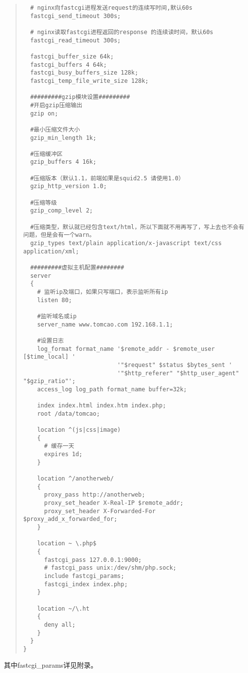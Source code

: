 \documentclass[UTF8]{ctexart}
\newenvironment{myquote}
  {\begin{quote} \kaishu \zihao{-5}}
  {\end{quote}}
\begin{document}
\begin{myquote}
\begin{verbatim}
  # nginx向fastcgi进程发送request的连续写时间,默认60s
  fastcgi_send_timeout 300s;

  # nginx读取fastcgi进程返回的response 的连续读时间，默认60s
  fastcgi_read_timeout 300s;

  fastcgi_buffer_size 64k;
  fastcgi_buffers 4 64k;
  fastcgi_busy_buffers_size 128k;
  fastcgi_temp_file_write_size 128k;

  #########gzip模块设置#########
  #开启gzip压缩输出
  gzip on;

  #最小压缩文件大小
  gzip_min_length 1k;

  #压缩缓冲区
  gzip_buffers 4 16k;

  #压缩版本（默认1.1，前端如果是squid2.5 请使用1.0）
  gzip_http_version 1.0;

  #压缩等级
  gzip_comp_level 2;

  #压缩类型，默认就已经包含text/html，所以下面就不用再写了，写上去也不会有问题，但是会有一个warn。
  gzip_types text/plain application/x-javascript text/css application/xml;

  #########虚拟主机配置########
  server
  {
    # 监听ip及端口，如果只写端口，表示监听所有ip
    listen 80;

    #监听域名或ip
    server_name www.tomcao.com 192.168.1.1;

    #设置日志
    log_format format_name '$remote_addr - $remote_user [$time_local] '
                           '"$request" $status $bytes_sent '
                           '"$http_referer" "$http_user_agent" "$gzip_ratio"';
    access_log log_path format_name buffer=32k;

    index index.html index.htm index.php;
    root /data/tomcao;

    location ^(js|css|image)
    {
      # 缓存一天
      expires 1d;
    }

    location ^/anotherweb/
    {
      proxy_pass http://anotherweb;
      proxy_set_header X-Real-IP $remote_addr;
      proxy_set_header X-Forwarded-For $proxy_add_x_forwarded_for;
    }

    location ~ \.php$
    {
      fastcgi_pass 127.0.0.1:9000;
      # fastcgi_pass unix:/dev/shm/php.sock;
      include fastcgi_params;
      fastcgi_index index.php;
    }

    location ~/\.ht
    {
      deny all;
    }
  }
}
  \end{verbatim}
\end{myquote}
其中fastcgi\_params详见附录。
\end{document}
